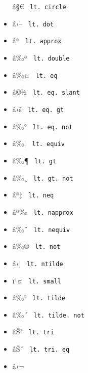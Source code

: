 \begin{itemize}
  \label{symbol-lt.circle}{{ â§€ }
  \texttt{\ lt.\ circle\ }}
\item
  \label{symbol-lt.dot}{{ â‹-- } \texttt{\ lt.\ dot\ }}
\item
  \label{symbol-lt.approx}{{ âª }
  \texttt{\ lt.\ approx\ }}
\item
  \label{symbol-lt.double}{{ â‰ª }
  \texttt{\ lt.\ double\ }}
\item
  \label{symbol-lt.eq}{{ â‰¤ } \texttt{\ lt.\ eq\ }}
\item
  \label{symbol-lt.eq.slant}{{ â©½ }
  \texttt{\ lt.\ eq.\ slant\ }}
\item
  \label{symbol-lt.eq.gt}{{ â‹š }
  \texttt{\ lt.\ eq.\ gt\ }}
\item
  \label{symbol-lt.eq.not}{{ â‰° }
  \texttt{\ lt.\ eq.\ not\ }}
\item
  \label{symbol-lt.equiv}{{ â‰¦ }
  \texttt{\ lt.\ equiv\ }}
\item
  \label{symbol-lt.gt}{{ â‰¶ } \texttt{\ lt.\ gt\ }}
\item
  \label{symbol-lt.gt.not}{{ â‰¸ }
  \texttt{\ lt.\ gt.\ not\ }}
\item
  \label{symbol-lt.neq}{{ âª‡ } \texttt{\ lt.\ neq\ }}
\item
  \label{symbol-lt.napprox}{{ âª‰ }
  \texttt{\ lt.\ napprox\ }}
\item
  \label{symbol-lt.nequiv}{{ â‰¨ }
  \texttt{\ lt.\ nequiv\ }}
\item
  \label{symbol-lt.not}{{ â‰® } \texttt{\ lt.\ not\ }}
\item
  \label{symbol-lt.ntilde}{{ â‹¦ }
  \texttt{\ lt.\ ntilde\ }}
\item
  \label{symbol-lt.small}{{ ï¹¤ }
  \texttt{\ lt.\ small\ }}
\item
  \label{symbol-lt.tilde}{{ â‰² }
  \texttt{\ lt.\ tilde\ }}
\item
  \label{symbol-lt.tilde.not}{{ â‰´ }
  \texttt{\ lt.\ tilde.\ not\ }}
\item
  \label{symbol-lt.tri}{{ âŠ² } \texttt{\ lt.\ tri\ }}
\item
  \label{symbol-lt.tri.eq}{{ âŠ´ }
  \texttt{\ lt.\ tri.\ eq\ }}
\item
  \label{symbol-lt.tri.eq.not}{{ â‹¬ }
}
\end{itemize}
